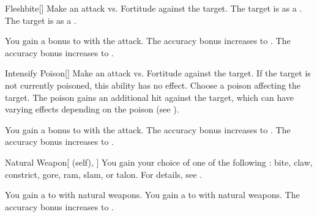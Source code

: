 \lowercase{\hypertarget{spell:Fleshbite}{}}\label{spell:Fleshbite}
\begin{freeability}[Rank 1]{\hypertarget{spell:Fleshbite}{Fleshbite}}[]
Make an attack vs. Fortitude against the target.
\hit The target is  as a .
\crit The target is  as a .

\rankline
{} You gain a  bonus to  with the attack.
 The accuracy bonus increases to .
 The accuracy bonus increases to .
\end{freeability}
\vspace{0.25em}



\lowercase{\hypertarget{spell:Intensify Poison}{}}\label{spell:Intensify Poison}
\begin{freeability}[Rank 1]{\hypertarget{spell:Intensify Poison}{Intensify Poison}}[]
Make an attack vs. Fortitude against the target.
If the target is not currently poisoned, this ability has no effect.
\hit Choose a poison affecting the target.
The poison gains an additional hit against the target, which can have varying effects depending on the poison (see ).

\rankline
{} You gain a  bonus to  with the attack.
 The accuracy bonus increases to .
 The accuracy bonus increases to .
\end{freeability}
\vspace{0.25em}



\lowercase{\hypertarget{spell:Natural Weapon}{}}\label{spell:Natural Weapon}
\begin{attuneability}[Rank 1]{\hypertarget{spell:Natural Weapon}{Natural Weapon}}[ (self), ]
You gain your choice of one of the following : bite, claw, constrict, gore, ram, slam, or talon.
For details, see .

\rankline
{} You gain a   to  with natural weapons.
 You gain a   to  with natural weapons.
 The accuracy bonus increases to .
\end{attuneability}
\vspace{0.25em}



